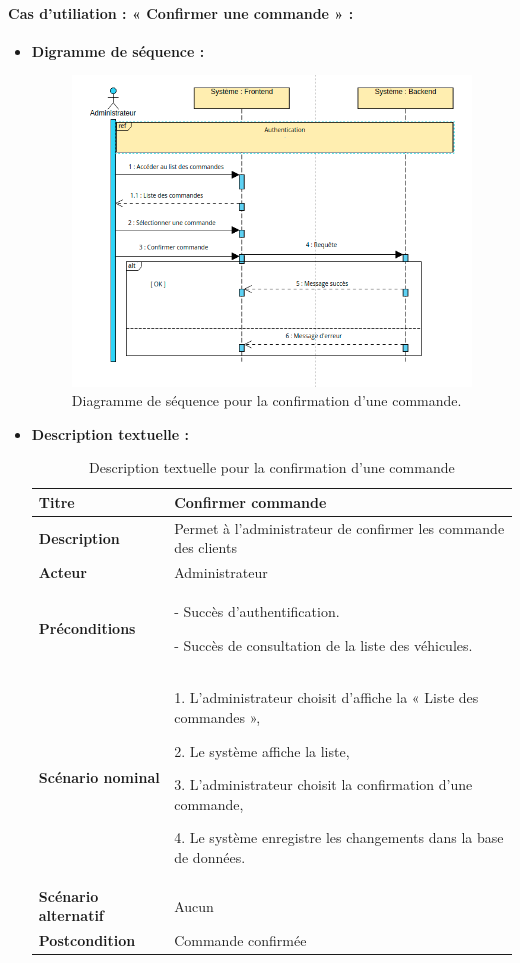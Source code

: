 \documentclass[a4paper, 12pt]{report}
\begin{document}
\paragraph{Cas d'utiliation : « Confirmer une commande » :}
\begin{itemize}
    \item \textbf{Digramme de séquence :}
    \begin{figure}[H]
    \centering
    \includegraphics[width = 1\linewidth]{img/sequence3.png}
    \caption{Diagramme de séquence pour la confirmation d'une commande.}
\end{figure}
    \item \textbf{Description textuelle :}
        \begin{table}[H]
\begin{tabular}{|p{6cm}|p{6cm}|} 
\hline  
\raggedright \textbf{Titre} & Confirmer commande   \tabularnewline  
\hline
\raggedright \textbf{Description}  &  Permet à l'administrateur de confirmer les commande des clients \tabularnewline  
\hline  
\raggedright \textbf{Acteur}  &  Administrateur\tabularnewline 
\hline
\raggedright \textbf{Préconditions}  &   
- Succès d’authentification.


- Succès de consultation de la liste des véhicules.
\tabularnewline
\hline
\raggedright \textbf{Scénario nominal}  &  
1. L'administrateur choisit d’affiche la « Liste des commandes »,


2. Le système affiche la liste,


3. L'administrateur choisit la confirmation d’une commande,


4. Le système enregistre les changements dans la base de données.
\tabularnewline
\hline
\raggedright \textbf{Scénario alternatif} & Aucun \tabularnewline
\hline
\raggedright \textbf{Postcondition} & Commande confirmée \tabularnewline
\hline
\end{tabular}
\caption{Description textuelle pour la confirmation d'une commande}
\end{table}
\end{itemize}
\end{document}
